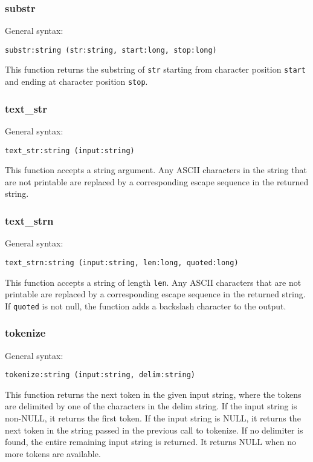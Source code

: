 \documentclass[twoside,english]{article}
\newenvironment{vindent}
{\begin{list}{}{\setlength{\listparindent}{6pt}}
\item[]}
{\end{list}}
\begin{document}
\subsubsection{substr}
General syntax:

\begin{vindent}
\begin{verbatim}
substr:string (str:string, start:long, stop:long)
\end{verbatim}
\end{vindent}
This function returns the substring of \texttt{str} starting from character
position \texttt{start} and ending at character position \texttt{stop}.


\subsubsection{text\_str}
General syntax:

\begin{vindent}
\begin{verbatim}
text_str:string (input:string)
\end{verbatim}
\end{vindent}
This function accepts a string argument. Any ASCII characters in the string
that are not printable are replaced by a corresponding escape sequence in
the returned string.


\subsubsection{text\_strn}
General syntax:

\begin{vindent}
\begin{verbatim}
text_strn:string (input:string, len:long, quoted:long)
\end{verbatim}
\end{vindent}
This function accepts a string of length \texttt{len}. Any ASCII characters
that are not printable are replaced by a corresponding escape sequence in
the returned string. If \texttt{quoted} is not null, the function adds a
backslash character to the output.


\subsubsection{tokenize}

General syntax:

\begin{vindent}
\begin{verbatim}
tokenize:string (input:string, delim:string)
\end{verbatim}
\end{vindent}
This function returns the next token in the given input string, where 
the tokens are delimited by one of the characters in the delim string.
If the input string is non-NULL, it returns the first token. If the input string
is NULL, it returns the next token in the string passed in the previous call
to tokenize. If no delimiter is found, the entire remaining input string
is returned.  It returns NULL when no more tokens are available.
\end{document}
